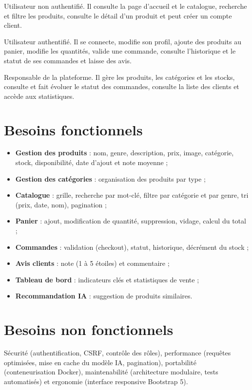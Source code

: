 \documentclass[11pt,a4paper]{report}
\begin{document}
\begin{description}[leftmargin=2.2em,style=nextline]
  \item[Visiteur] Utilisateur non authentifié. Il consulte la page d'accueil et
    le catalogue, recherche et filtre les produits, consulte le détail d'un
    produit et peut créer un compte client.
  \item[Client] Utilisateur authentifié. Il se connecte, modifie son profil,
    ajoute des produits au panier, modifie les quantités, valide une commande,
    consulte l'historique et le statut de ses commandes et laisse des avis.
  \item[Administrateur / gestionnaire] Responsable de la plateforme. Il gère les
    produits, les catégories et les stocks, consulte et fait évoluer le statut
    des commandes, consulte la liste des clients et accède aux statistiques.
\end{description}

\section{Besoins fonctionnels}
\begin{itemize}[leftmargin=1.4em]
  \item \textbf{Gestion des produits} : nom, genre, description, prix, image,
        catégorie, stock, disponibilité, date d'ajout et note moyenne ;
  \item \textbf{Gestion des catégories} : organisation des produits par type ;
  \item \textbf{Catalogue} : grille, recherche par mot-clé, filtre par catégorie
        et par genre, tri (prix, date, nom), pagination ;
  \item \textbf{Panier} : ajout, modification de quantité, suppression, vidage,
        calcul du total ;
  \item \textbf{Commandes} : validation (checkout), statut, historique,
        décrément du stock ;
  \item \textbf{Avis clients} : note (1 à 5 étoiles) et commentaire ;
  \item \textbf{Tableau de bord} : indicateurs clés et statistiques de vente ;
  \item \textbf{Recommandation IA} : suggestion de produits similaires.
\end{itemize}

\section{Besoins non fonctionnels}
Sécurité (authentification, CSRF, contrôle des rôles), performance (requêtes
optimisées, mise en cache du modèle IA, pagination), portabilité
(conteneurisation Docker), maintenabilité (architecture modulaire, tests
automatisés) et ergonomie (interface responsive Bootstrap 5).
\end{document}
